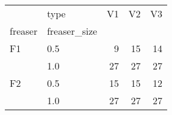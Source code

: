 \begin{tabular}{llrrr}
\toprule
   & type &  V1 &  V2 &  V3 \\
freaser & freaser\_size &     &     &     \\
\midrule
F1 & 0.5 &   9 &  15 &  14 \\
   & 1.0 &  27 &  27 &  27 \\
F2 & 0.5 &  15 &  15 &  12 \\
   & 1.0 &  27 &  27 &  27 \\
\bottomrule
\end{tabular}

